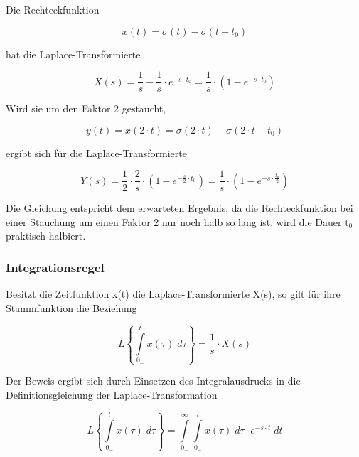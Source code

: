 \noindent Die Rechteckfunktion 

\begin{equation}\label{eq:fourfiftyfour}
x\left(t\right)=\sigma \left(t\right)-\sigma \left(t-t_{0} \right)
\end{equation}

\noindent hat die Laplace-Transformierte 

\begin{equation}\label{eq:fourfiftyfive}
X\left(s\right)=\frac{1}{s} -\frac{1}{s} \cdot e^{-s\cdot t_{0} } =\frac{1}{s} \cdot \left(1-e^{-s\cdot t_{0} } \right)
\end{equation}

\noindent Wird sie um den Faktor 2 gestaucht, 

\begin{equation}\label{eq:fourfiftysix}
y\left(t\right)=x\left(2\cdot t\right)=\sigma \left(2\cdot t\right)-\sigma \left(2\cdot t-t_{0} \right)
\end{equation}

\noindent ergibt sich für die Laplace-Transformierte

\begin{equation}\label{eq:fourfiftyseven}
Y\left(s\right)=\frac{1}{2} \cdot \frac{2}{s} \cdot \left(1-e^{-\frac{s}{2} \cdot t_{0} } \right)=\frac{1}{s} \cdot \left(1-e^{-s\cdot \frac{t_{0} }{2} } \right)
\end{equation}

\noindent Die Gleichung entspricht dem erwarteten Ergebnis, da die Rechteckfunktion bei einer Stauchung um einen Faktor 2 nur noch halb so lang ist, wird die Dauer t$_{0}$ praktisch halbiert.

\subsubsection{Integrationsregel}

\noindent Besitzt die Zeitfunktion x(t) die Laplace-Transformierte X(s), so gilt für ihre Stammfunktion die
Beziehung

\begin{equation}\label{eq:fourfiftyeight}
L\left\{\int\limits _{0_{-} }^{t}x\left(\tau \right)\;d\tau  \right\}=\frac{1}{s} \cdot X\left(s\right)
\end{equation}

\noindent Der Beweis ergibt sich durch Einsetzen des Integralausdrucks in die Definitionsgleichung der Laplace-Transformation

\begin{equation}\label{eq:fourfiftynine}
L\left\{\int\limits _{0_{-} }^{t}x\left(\tau \right)\;d\tau  \right\}=\int\limits _{0_{-} }^{\infty }\int\limits _{0_{-} }^{t}x\left(\tau \right)\;d\tau  \cdot e^{-s\cdot t} \;dt
\end{equation}

